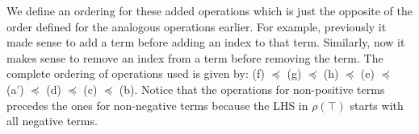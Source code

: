 \documentclass{article}
\renewcommand\[{\begin{equation}}
\renewcommand\]{\end{equation}}
\begin{document}
We define an ordering for these added operations which is just the opposite of the order defined for the analogous operations earlier. For example, previously it made sense to add a term before adding an index to that term. Similarly, now it makes sense to remove an index from a term before removing the term. 
The complete ordering of operations used is given by: (f) $\preceq$ (g) $\preceq$ (h) $\preceq$ (e) $\preceq$ (a') $\preceq$ (d)
$\preceq$ (c) $\preceq$ (b). Notice that the operations for non-positive terms precedes the ones for non-negative terms because the LHS in $\rho(\top)$ starts with all negative terms.
\end{document}
